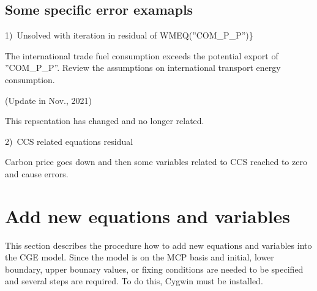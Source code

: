 \documentclass[10pt,a4paper,titlepage,dvipdfmx]{book}
\begin{document}
\subsection{\label{subsec:SomSpeErr}Some specific error examapls}

1)~Unsolved with iteration in residual of WMEQ(''COM\_P\_P'')\}

  The international trade fuel consumption exceeds the potential export of ''COM\_P\_P''. Review the assumptions on international transport energy consumption.

(Update in Nov., 2021)

This repsentation has changed and no longer related.

2)~CCS related equations residual\label{mark-2)}

  Carbon price goes down and then some variables related to CCS reached to zero and cause errors.

\section{\label{sec:AddNewEquVar}Add new equations and variables}

This section describes the procedure how to add new equations and variables into the CGE model. Since the model is on the MCP basis and initial, lower boundary, upper bounary values, or fixing conditions are needed to be specified and several steps are required. To do this, Cygwin must be installed.
\end{document}
